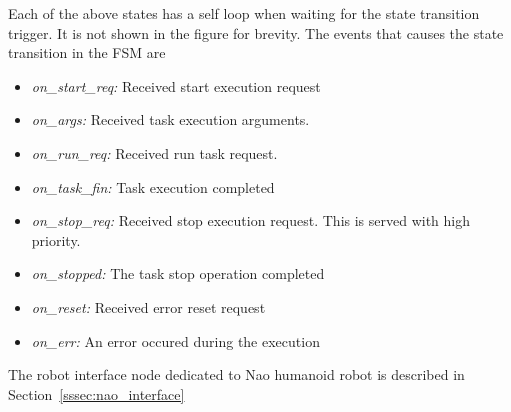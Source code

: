 Each of the above states has a self loop when waiting for the state transition trigger. It is not shown in the figure for brevity. The events that causes the state transition in the FSM are
\begin{itemize}[leftmargin={1cm},topsep={0pt},itemsep={0pt},partopsep={0pt},parsep={0pt}] 
\item \emph{on\_start\_req:} Received start execution request
\item \emph{on\_args:} Received task execution arguments.
\item \emph{on\_run\_req:} Received run task request.
\item \emph{on\_task\_fin:} Task execution completed
\item \emph{on\_stop\_req:} Received stop execution request. This is served with high priority.
\item \emph{on\_stopped:} The task stop operation completed
\item \emph{on\_reset:} Received error reset request
\item \emph{on\_err:} An error occured during the execution
\end{itemize}
The robot interface node dedicated to Nao humanoid robot is described in Section~\ref{sssec:nao_interface}
